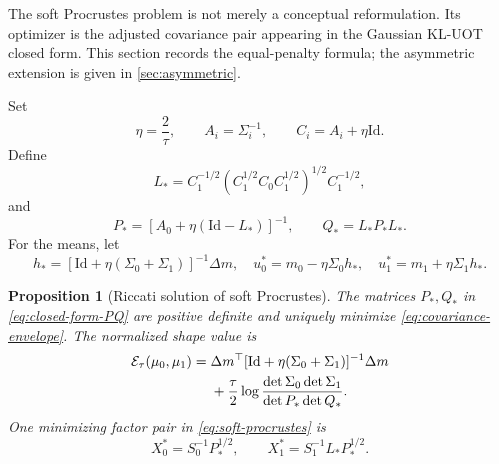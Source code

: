 \documentclass[11pt]{article}
\newtheorem{proposition}[theorem]{Proposition}
\theoremstyle{definition}
\theoremstyle{remark}
\newcommand{\Id}{\mathrm{Id}}
\begin{document}
The soft Procrustes problem is not merely a conceptual reformulation. Its
optimizer is the adjusted covariance pair appearing in the Gaussian KL-UOT
closed form. This section records the equal-penalty formula; the asymmetric
extension is given in \cref{sec:asymmetric}.

Set
\begin{equation}\label{eq:shifted-precisions}
 \eta=\frac2\tau,
 \qquad A_i=\Sigma_i^{-1},
 \qquad C_i=A_i+\eta\Id.
\end{equation}
Define
\begin{equation}\label{eq:closed-form-L}
 L_*=C_1^{-1/2}
 \left(C_1^{1/2}C_0C_1^{1/2}\right)^{1/2}
 C_1^{-1/2},
\end{equation}
and
\begin{equation}\label{eq:closed-form-PQ}
 P_*=[A_0+\eta(\Id-L_*)]^{-1},
 \qquad Q_*=L_*P_*L_*.
\end{equation}
For the means, let
\begin{equation}\label{eq:closed-form-means}
 h_*=[\Id+\eta(\Sigma_0+\Sigma_1)]^{-1}\Delta m,
 \quad
 u_0^*=m_0-\eta\Sigma_0h_*,
 \quad
 u_1^*=m_1+\eta\Sigma_1h_*.
\end{equation}

\begin{proposition}[Riccati solution of soft Procrustes]
\label{prop:riccati-soft-procrustes}
The matrices $P_*,Q_*$ in \eqref{eq:closed-form-PQ} are positive definite and
uniquely minimize \eqref{eq:covariance-envelope}. The normalized shape value is
\begin{align}
 \mathcal E_\tau(\mu_0,\mu_1)
 ={}&\Delta m^\top[\Id+\eta(\Sigma_0+\Sigma_1)]^{-1}\Delta m\notag\\
 &+\frac\tau2\log
 \frac{\det\Sigma_0\det\Sigma_1}{\det P_*\det Q_*}.
 \label{eq:closed-form-shape-value}
\end{align}
One minimizing factor pair in \eqref{eq:soft-procrustes} is
\begin{equation}\label{eq:closed-form-soft-factors}
 X_0^*=S_0^{-1}P_*^{1/2},
 \qquad
 X_1^*=S_1^{-1}L_*P_*^{1/2}.
\end{equation}
\end{proposition}
\end{document}
